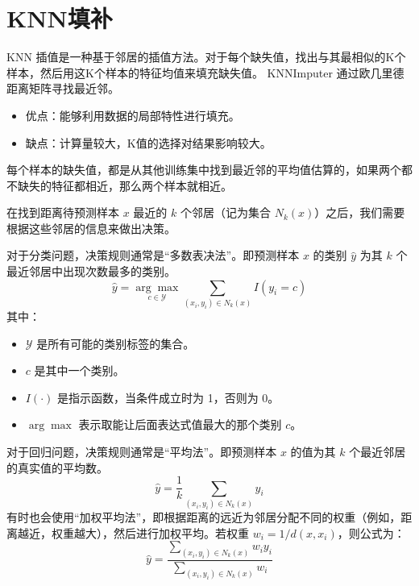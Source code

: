 \section{KNN填补}

\begin{definition}[KNN 插值]
    KNN 插值是一种基于邻居的插值方法。对于每个缺失值，找出与其最相似的K个样本，然后用这K个样本的特征均值来填充缺失值。
    KNNImputer 通过欧几里德距离矩阵寻找最近邻。
\end{definition}

\begin{tips}
    \begin{itemize}
        \item 优点：能够利用数据的局部特性进行填充。
        \item 缺点：计算量较大，K值的选择对结果影响较大。
    \end{itemize}
\end{tips}

每个样本的缺失值，都是从其他训练集中找到最近邻的平均值估算的，如果两个都不缺失的特征都相近，那么两个样本就相近。

在找到距离待预测样本 $x$ 最近的 $k$ 个邻居（记为集合 $N_k(x)$）之后，我们需要根据这些邻居的信息来做出决策。

\begin{definition}
    对于分类问题，决策规则通常是“多数表决法”。即预测样本 $x$ 的类别 $\hat{y}$ 为其 $k$ 个最近邻居中出现次数最多的类别。
    $$
        \hat{y} = \underset{c \in \mathcal{Y}}{\arg\max} \sum_{(x_i, y_i) \in N_k(x)} I(y_i = c)
    $$
    其中：
    \begin{itemize}
        \item $\mathcal{Y}$ 是所有可能的类别标签的集合。
        \item $c$ 是其中一个类别。
        \item $I(\cdot)$ 是指示函数，当条件成立时为 1，否则为 0。
        \item $\arg\max$ 表示取能让后面表达式值最大的那个类别 $c$。
    \end{itemize}
\end{definition}

\begin{definition}
    对于回归问题，决策规则通常是“平均法”。即预测样本 $x$ 的值为其 $k$ 个最近邻居的真实值的平均数。
    $$
        \hat{y} = \frac{1}{k} \sum_{(x_i, y_i) \in N_k(x)} y_i
    $$
    有时也会使用“加权平均法”，即根据距离的远近为邻居分配不同的权重（例如，距离越近，权重越大），然后进行加权平均。若权重 $w_i = 1/d(x, x_i)$，则公式为：
    $$
        \hat{y} = \frac{\sum_{(x_i, y_i) \in N_k(x)} w_i y_i}{\sum_{(x_i, y_i) \in N_k(x)} w_i}
    $$
\end{definition}

